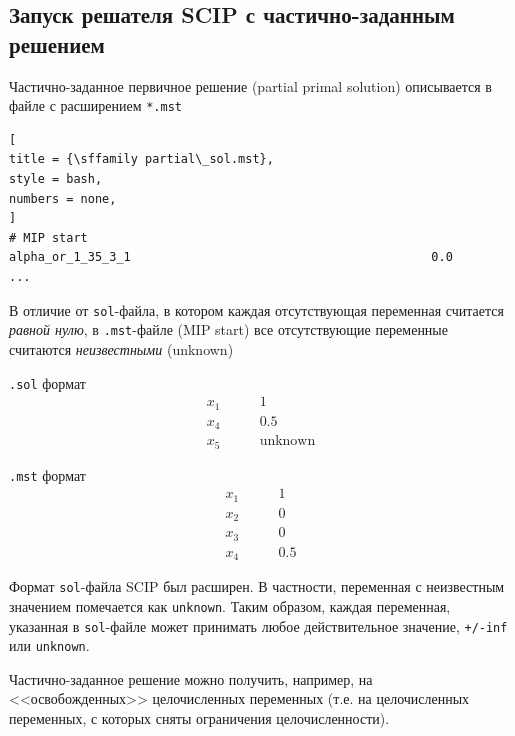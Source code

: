 \documentclass[%
	11pt,
	a4paper,
	utf8,
		]{article}
\begin{document}
\subsection{Запуск решателя SCIP с частично-заданным решением}

Частично-заданное первичное решение (partial primal solution) описывается в файле с расширением \verb|*.mst|
\begin{lstlisting}[
title = {\sffamily partial\_sol.mst},
style = bash,
numbers = none,
]
# MIP start
alpha_or_1_35_3_1                                          0.0
...
\end{lstlisting}

В отличие от \verb|sol|-файла, в котором каждая отсутствующая переменная считается \emph{равной нулю}, в \texttt{.mst}-файле (MIP start) все отсутствующие переменные считаются \emph{неизвестными} (unknown)

\begin{minipage}[t]{0.35\textwidth}
	\hspace*{25mm}\texttt{.sol} формат
	\begin{align*}
		x_1& \qquad 1\\
		x_4& \qquad 0.5 \\
		x_5& \qquad \text{unknown}
	\end{align*}
\end{minipage}
\hspace*{2mm}
\begin{minipage}[t]{0.35\textwidth}
	\hspace*{25mm}\texttt{.mst} формат
	\begin{align*}
		x_1& \qquad 1 \\
		x_2& \qquad 0 \\
		x_3& \qquad 0 \\
		x_4& \qquad 0.5
	\end{align*}
\end{minipage}

Формат \texttt{sol}-файла SCIP был расширен. В частности, переменная с неизвестным значением помечается как \texttt{unknown}. Таким образом, каждая переменная, указанная в \texttt{sol}-файле может принимать любое действительное значение, \texttt{+/-inf} или \texttt{unknown}.


Частично-заданное решение можно получить, например, на <<освобожденных>> целочисленных переменных (т.е. на целочисленных переменных, с которых сняты ограничения целочисленности).
\end{document}
